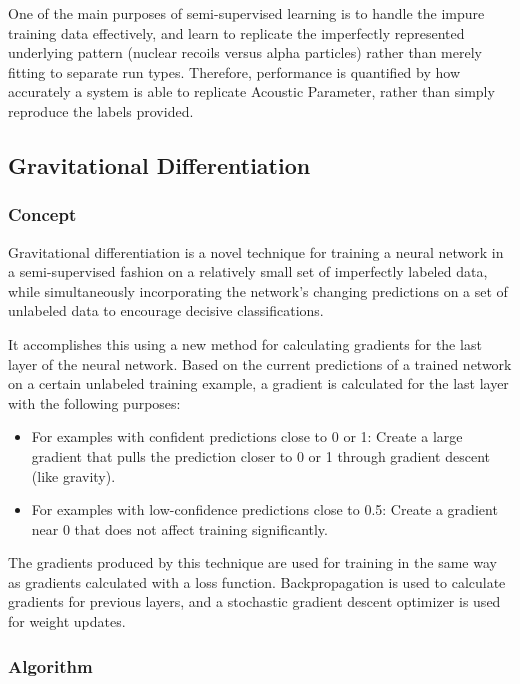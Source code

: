 \documentclass[10pt]{article}
\begin{document}
One of the main purposes of semi-supervised learning is to handle the impure training data effectively, and learn to replicate the imperfectly represented underlying pattern (nuclear recoils versus alpha particles) rather than merely fitting to separate run types. Therefore, performance is quantified by how accurately a system is able to replicate Acoustic Parameter, rather than simply reproduce the labels provided.

\subsection{Gravitational Differentiation}

\subsubsection{Concept}

Gravitational differentiation is a novel technique for training a neural network in a semi-supervised fashion on a relatively small set of imperfectly labeled data, while simultaneously incorporating the network's changing predictions on a set of unlabeled data to encourage decisive classifications.

It accomplishes this using a new method for calculating gradients for the last layer of the neural network. Based on the current predictions of a trained network on a certain unlabeled training example, a gradient is calculated for the last layer with the following purposes:

\begin{itemize}
    \item For examples with confident predictions close to 0 or 1: Create a large gradient that pulls the prediction closer to 0 or 1 through gradient descent (like gravity).
    \item For examples with low-confidence predictions close to 0.5: Create a gradient near 0 that does not affect training significantly.
\end{itemize}

The gradients produced by this technique are used for training in the same way as gradients calculated with a loss function. Backpropagation is used to calculate gradients for previous layers, and a stochastic gradient descent optimizer is used for weight updates.

\subsubsection{Algorithm}
\end{document}
